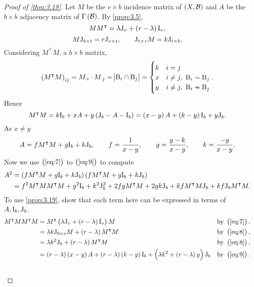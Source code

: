 \begin{proof}[Proof of \ref{thm:3.18}]
Let $ M $ be the $ v \times b $ incidence matrix of $ \br{X, \BBB} $ and $ A $ be the $ b \times b $ adjacency matrix of $ \Gamma\br{\BBB} $. By \ref{prop:3.5},
\begin{equation}
\label{eq:7}
MM^\intercal = \lambda \J_v + \br{r - \lambda}\I_v,
\end{equation}
\begin{equation}
\label{eq:8}
M\mathrm{J}_{b \times t} = r\mathrm{J}_{v \times t}, \qquad \mathrm{J}_{t \times v}M = k\mathrm{J}_{t \times b}.
\end{equation}
Considering $ M^\intercal M $, a $ b \times b $ matrix,
$$ \br{M^\intercal M}_{ij} = M_{\cdot i} \cdot M_{\cdot j} = \abs{\B_i \cap \B_j} =
\begin{cases}
k & i = j \\
x & i \ne j, \ \B_i \sim \B_j \\
y & i \ne j, \ \B_i \nsim \B_j
\end{cases}.
$$
Hence
\begin{equation}
\label{eq:9}
M^\intercal M = k\I_b + xA + y\br{\J_b - A - \I_b} = \br{x - y}A + \br{k - y}\I_b + y\J_b.
\end{equation}
As $ x \ne y $
$$ A = fM^\intercal M + g\mathrm{I}_b + k\mathrm{J}_b, \qquad f = \dfrac{1}{x - y}, \qquad g = \dfrac{y - k}{x - y}, \qquad k = \dfrac{-y}{x - y}. $$
Now we use $ \br{\ref{eq:7}} $ to $ \br{\ref{eq:9}} $ to compute
\begin{align*}
A^2
& = \br{fM^\intercal M + g\I_b + k\J_b}\br{fM^\intercal M + g\I_b + k\J_b} \\
& = f^2M^\intercal MM^\intercal M + g^2\I_b + k^2\J_b^2 + 2fgM^\intercal M + 2gk\J_b + kfM^\intercal M\J_b + kf\J_bM^\intercal M.
\end{align*}
To use \ref{prop:3.19}, show that each term here can be expressed in terms of $ A, \mathrm{I}_b, \mathrm{J}_b $.
\begin{align*}
M^\intercal MM^\intercal M
& = M^\intercal\br{\lambda\J_v + \br{r - \lambda}\I_v}M & \text{by} \ \br{\ref{eq:7}}, \\
& = \lambda k\J_{b \times v}M + \br{r - \lambda}M^\intercal M & \text{by} \ \br{\ref{eq:8}}, \\
& = \lambda k^2\J_b + \br{r - \lambda}M^\intercal M & \text{by} \ \br{\ref{eq:8}}, \\
& = \br{r - \lambda}\br{x - y}A + \br{r - \lambda}\br{k - y}\I_b + \br{\lambda k^2 + \br{r - \lambda}y}\J_b & \text{by} \ \br{\ref{eq:9}}. \\
\\

\end{align*}
\end{proof}
